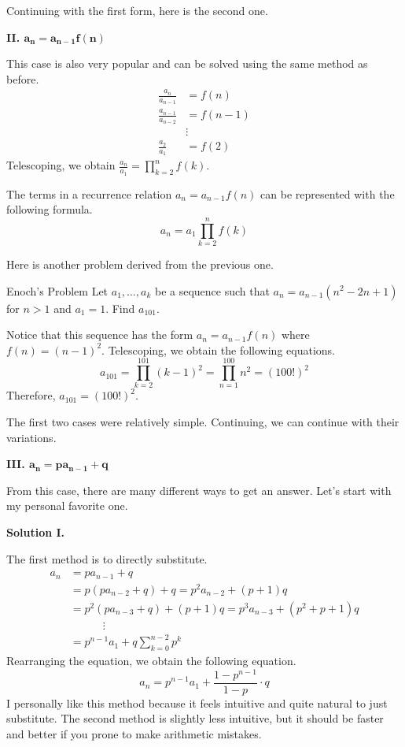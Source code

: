 \documentclass[../../../main.tex]{subfiles}
\begin{document}
Continuing with the first form, here is the second one.

{\Large\textcolor{BrickRed}
{\textbf{II. $\mathbf{a_n = a_{n-1} f(n)}$}}}

This case is also very popular and can be solved using the same method
as before.
\begin{align*}
    \frac{a_n}{a_{n-1}} &= f(n) \\
    \frac{a_{n-1}}{a_{n-2}} &= f(n-1) \\
    &\vdots \\
    \frac{a_2}{a_1} &= f(2)
\end{align*}
Telescoping, we obtain $\frac{a_n}{a_1} = \prod_{k=2}^n f(k)$.

\begin{important}
The terms in a recurrence relation $a_n = a_{n-1} f(n)$ can be
represented with the following formula.
\[
a_n = a_1 \prod_{k=2}^n f(k)
\]
\end{important}

Here is another problem derived from the previous one.

\begin{problem}{Enoch's Problem}{}
Let $a_1, \ldots, a_k$ be a sequence such that $a_n = a_{n-1} (
n^2 - 2n + 1)$ for $n > 1$ and $a_1 = 1$. Find $a_{101}$.
\end{problem}
\begin{solution}
Notice that this sequence has the form $a_n = a_{n-1} f(n)$ where
$f(n) = (n-1)^2$. Telescoping, we obtain the following equations.
\[
a_{101}
= \prod_{k=2}^{101} (k-1)^2
= \prod_{n=1}^{100} n^2
= (100!)^2
\]
Therefore, $a_{101} = (100!)^2$.
\end{solution}

The first two cases were relatively simple. Continuing, we can
continue with their variations.

{\Large\textcolor{BrickRed}
{\textbf{III. $\mathbf{a_n = p a_{n-1} + q}$}}}

From this case, there are many different ways to get an answer.
Let's start with my personal favorite one.

{\large\textbf{Solution I.}}

The first method is to directly substitute.
\begin{align*}
    a_n
    &= p a_{n-1} + q \\
    &= p (p a_{n-2} + q) + q
    = p^2 a_{n-2} + (p + 1)q \\
    &= p^2 (p a_{n-3} + q) + (p + 1)q
    = p^3 a_{n-3} + (p^2 + p + 1)q \\
    &\qquad\quad\vdots \\
    &= p^{n-1} a_1 + q \sum_{k=0}^{n-2} p^k
\end{align*}
Rearranging the equation, we obtain the following equation.
\[
a_n = p^{n-1} a_1 + \frac{1 - p^{n-1}}{1 - p} \cdot q
\]
I personally like this method because it feels intuitive and quite
natural to just substitute. The second method is slightly less
intuitive, but it should be faster and better if you prone to make
arithmetic mistakes.
\end{document}
